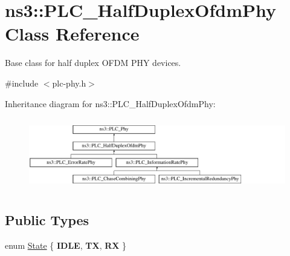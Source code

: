 \hypertarget{classns3_1_1PLC__HalfDuplexOfdmPhy}{\section{ns3\-:\-:\-P\-L\-C\-\_\-\-Half\-Duplex\-Ofdm\-Phy \-Class \-Reference}
\label{classns3_1_1PLC__HalfDuplexOfdmPhy}
}


\-Base class for half duplex \-O\-F\-D\-M \-P\-H\-Y devices.  




{\ttfamily \#include $<$plc-\/phy.\-h$>$}

\-Inheritance diagram for ns3\-:\-:\-P\-L\-C\-\_\-\-Half\-Duplex\-Ofdm\-Phy\-:\begin{figure}[H]
\begin{center}
\leavevmode
\includegraphics[height=3.177305cm]{classns3_1_1PLC__HalfDuplexOfdmPhy}
\end{center}
\end{figure}
\subsection*{\-Public \-Types}
\begin{DoxyCompactItemize}
\item 
enum \hyperlink{classns3_1_1PLC__HalfDuplexOfdmPhy_ae91e168f9a51bf5344e7e03d9ae13b60}{\-State} \{ {\bfseries \-I\-D\-L\-E}, 
{\bfseries \-T\-X}, 
{\bfseries \-R\-X}
 \}
\end{DoxyCompactItemize}
